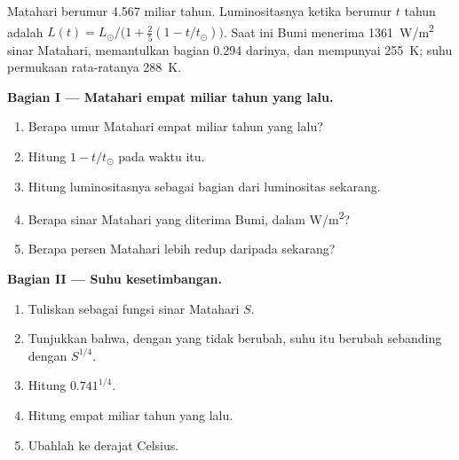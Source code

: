 \begin{problem}
\label{pb:g12:early-earth:1}
Matahari berumur \num{4.567} miliar tahun. Luminositasnya ketika berumur $t$
tahun adalah $L(t) = L_\odot/\bigl(1 + \tfrac25 (1 - t/t_\odot)\bigr)$. Saat
ini Bumi menerima \qty{1361}{W/m^2} sinar Matahari, memantulkan bagian 0.294
darinya, dan mempunyai  \qty{255}{K}; suhu permukaan
rata-ratanya \qty{288}{K}.

\medskip
\noindent\textbf{Bagian I --- Matahari empat miliar tahun yang lalu.}
\begin{enumerate}
  \item Berapa umur Matahari empat miliar tahun yang lalu?
  \item Hitung $1 - t/t_\odot$ pada waktu itu.
  \item Hitung luminositasnya sebagai bagian dari luminositas sekarang.
  \item Berapa sinar Matahari yang diterima Bumi, dalam \unit{W/m^2}?
  \item Berapa persen Matahari lebih redup daripada sekarang?
\end{enumerate}

\medskip
\noindent\textbf{Bagian II --- Suhu kesetimbangan.}
\begin{enumerate}[resume]
  \item Tuliskan  sebagai fungsi sinar Matahari $S$.
  \item Tunjukkan bahwa, dengan  yang tidak berubah, suhu itu berubah
        sebanding dengan $S^{1/4}$.
  \item Hitung $0.741^{1/4}$.
  \item Hitung  empat miliar tahun yang lalu.
  \item Ubahlah ke derajat Celsius.
\end{enumerate}


\end{problem}
